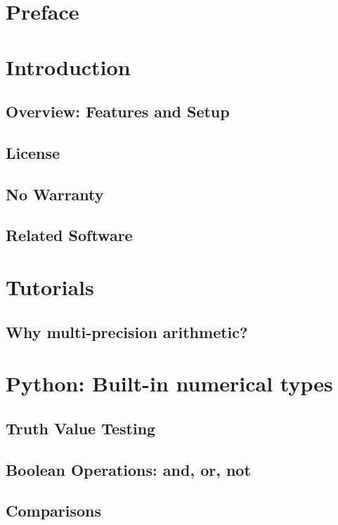 \documentclass[12pt,a4paper,openany]{book}
\begin{document}
\chapter{Preface}

\chapter{Introduction}

\section{Overview: Features and Setup}

\section{License}

\section{No Warranty}

\section{Related Software}

\chapter{Tutorials}

\section{Why multi-precision arithmetic?}

\chapter{Python: Built-in numerical types}

\section{Truth Value Testing}

\section{Boolean Operations: and, or, not}

\section{Comparisons}
\end{document}
